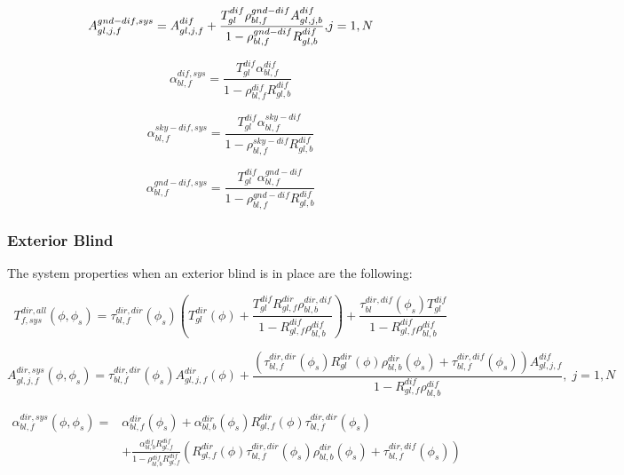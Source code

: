 \begin{equation}
A_{gl,j,f}^{gnd - dif,sys} = A_{gl,j,f}^{dif} + \frac{{T_{gl}^{dif}\rho_{bl,f}^{gnd - dif}A_{gl,j,b}^{dif}}}{{1 - \rho_{bl,f}^{gnd - dif}R_{gl,b}^{dif}}}{\rm{,    }}j = 1,N
\end{equation}

\begin{equation}
\alpha_{bl,f}^{dif,sys} = \frac{{T_{gl}^{dif}\alpha_{bl,f}^{dif}}}{{1 - \rho_{bl,f}^{dif}R_{gl,b}^{dif}}}
\end{equation}

\begin{equation}
\alpha_{bl,f}^{sky - dif,sys} = \frac{{T_{gl}^{dif}\alpha_{bl,f}^{sky - dif}}}{{1 - \rho_{bl,f}^{sky - dif}R_{gl,b}^{dif}}}
\end{equation}

\begin{equation}
\alpha_{bl,f}^{gnd - dif,sys} = \frac{{T_{gl}^{dif}\alpha_{bl,f}^{gnd - dif}}}{{1 - \rho_{bl,f}^{gnd - dif}R_{gl,b}^{dif}}}
\end{equation}

\subsubsection{Exterior Blind}\label{exterior-blind}

The system properties when an exterior blind is in place are the following:

\begin{equation}
T_{f,sys}^{dir,all}(\phi ,{\phi_s}) = \tau_{bl,f}^{dir,dir}({\phi_s})\left( {T_{gl}^{dir}(\phi ) + \frac{{T_{gl}^{dif}R_{gl,f}^{dir}\rho_{bl,b}^{dir,dif}}}{{1 - R_{gl,f}^{dif}\rho_{bl,b}^{dif}}}} \right) + \frac{{\tau_{bl}^{dir,dif}({\phi_s})T_{gl}^{dif}}}{{1 - R_{gl,f}^{dif}\rho_{bl,b}^{dif}}}
\end{equation}

\begin{equation}
A_{gl,j,f}^{dir,sys}(\phi ,\phi_s) = 
     \tau_{bl,f}^{dir,dir}(\phi_s) A_{gl,j,f}^{dir}(\phi ) + 
     \frac{
       \left(
         \tau_{bl,f}^{dir,dir}(\phi_s) R_{gl}^{dir}(\phi) \rho_{bl,b}^{dir}(\phi_s)+ \tau_{bl,f}^{dir,dif}(\phi_s)
       \right) A_{gl,j,f}^{dif}
     } {
       1 - R_{gl,f}^{dif}\rho_{bl,b}^{dif}
     },\;j = 1,N
\end{equation}

\begin{equation}
\begin{split}
\alpha_{bl,f}^{dir,sys}(\phi ,\phi_s) =& \alpha_{bl,f}^{dir}(\phi_s) + \alpha_{bl,b}^{dir}(\phi_s) R_{gl,f}^{dir}(\phi) \tau_{bl,f}^{dir,dir}(\phi_s) \\
&+ \frac{\alpha_{bl,b}^{dif}R_{gl,f}^{dif}}{1 - \rho_{bl,b}^{dif} R_{gl,f}^{dif}}\left(R_{gl,f}^{dir}(\phi) \tau_{bl,f}^{dir,dir}(\phi_s) \rho_{bl,b}^{dir}(\phi_s) + \tau_{bl,f}^{dir,dif}(\phi_s) \right)
\end{split}
\end{equation}


